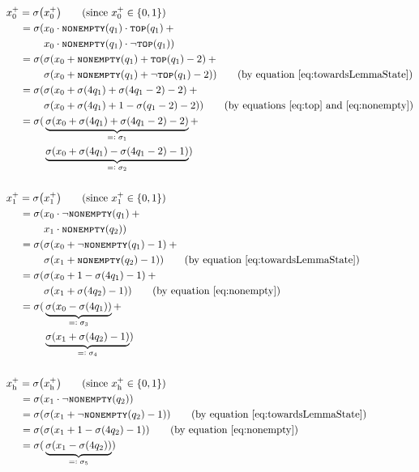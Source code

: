 \documentclass{book}
\newcommand{\eqdef}{=\vcentcolon}
\newcommand{\nonempty}{\textsc{\texttt{nonempty}}}
\newcommand{\tos}{\textsc{\texttt{top}}}
\newcommand{\h}{\mathrm{h}}
\theoremstyle{definition}
\theoremstyle{plain}
\theoremstyle{plain}
\theoremstyle{remark}
\theoremstyle{plain}
\begin{document}
	\begin{align*}
		x_0^+=\sigma\big(&x_0^+\big) \tag{since $x_0^+\in\{0,1\}$} \\
			 =\sigma(&x_0\cdot\nonempty(q_1)\cdot\tos(q_1)\:+ \\
					 &x_0\cdot\nonempty(q_1)\cdot\lnot\tos(q_1)) \\	
			 =\sigma(&\sigma(x_0+\nonempty(q_1)+\tos(q_1)-2)\:+ \\
					 &\sigma(x_0+\nonempty(q_1)+\lnot\tos(q_1)-2)) \tag{by equation \ref{eq:towardsLemmaState}}	\\
			 =\sigma(&\sigma(x_0+\sigma(4q_1)+\sigma(4q_1-2)-2)\:+ \\
					 &\sigma(x_0+\sigma(4q_1)+1-\sigma(q_1-2)-2)) \tag{by equations \ref{eq:top} and \ref{eq:nonempty}}	\\
			 =\sigma(&\underbrace{\sigma(x_0+\sigma(4q_1)+\sigma(4q_1-2)-2)}_\text{$\eqdef\sigma_1$}+ \\
					 &\underbrace{\sigma(x_0+\sigma(4q_1)-\sigma(4q_1-2)-1)}_\text{$\eqdef\sigma_2$}) \\\\
		x_1^+=\sigma\big(&x_1^+\big) \tag{since $x_1^+\in\{0,1\}$} \\
			 =\sigma(&x_0\cdot\lnot\nonempty(q_1)\:+ \\
					 &x_1\cdot\nonempty(q_2)) \\
			 =\sigma(&\sigma(x_0+\lnot\nonempty(q_1)-1)\:+ \\
					 &\sigma(x_1+\nonempty(q_2)-1)) \tag{by equation \ref{eq:towardsLemmaState}} \\
			 =\sigma(&\sigma(x_0+1-\sigma(4q_1)-1)\:+ \\
					 &\sigma(x_1+\sigma(4q_2)-1)) \tag{by equation \ref{eq:nonempty}} \\
			 =\sigma(&\underbrace{\sigma(x_0-\sigma(4q_1))}_\text{$\eqdef\sigma_3$}+ \\
					 &\underbrace{\sigma(x_1+\sigma(4q_2)-1)}_\text{$\eqdef\sigma_4$}) \\\\
		x_\h^+=\sigma\big(&x_\h^+\big) \tag{since $x_\h^+\in\{0,1\}$} \\
			  =\sigma(&x_1\cdot\lnot\nonempty(q_2)) \\
			  =\sigma(&\sigma(x_1+\lnot\nonempty(q_2)-1)) \tag{by equation \ref{eq:towardsLemmaState}}	\\
			  =\sigma(&\sigma(x_1+1-\sigma(4q_2)-1)) \tag{by equation \ref{eq:nonempty}} \\
			  =\sigma(&\underbrace{\sigma(x_1-\sigma(4q_2))}_\text{$\eqdef\sigma_5$}) \\\\

\end{align*}
\end{document}
